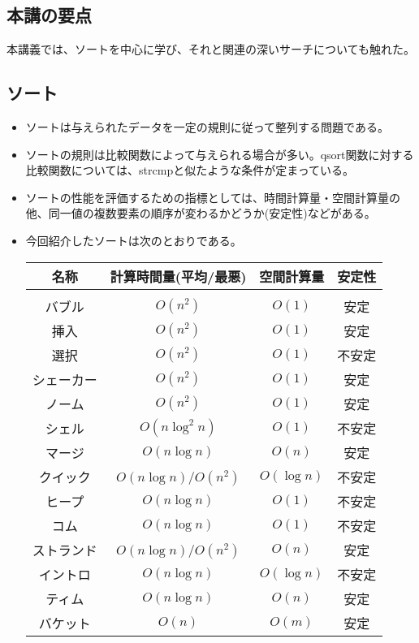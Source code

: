 \begin{shadebox}
\section*{本講の要点}
本講義では、ソートを中心に学び、それと関連の深いサーチについても触れた。
\subsection*{ソート}
\begin{itemize}
\item ソートは与えられたデータを一定の規則に従って整列する問題である。
\item ソートの規則は比較関数によって与えられる場合が多い。qsort関数に対する比較関数については、strcmpと似たような条件が定まっている。
\item ソートの性能を評価するための指標としては、時間計算量・空間計算量の他、同一値の複数要素の順序が変わるかどうか(安定性)などがある。
\item 今回紹介したソートは次のとおりである。
\begin{center}
\begin{tabular}{|c||c|c|c|}\hline 
名称&計算時間量(平均/最悪)&空間計算量&安定性\\ \hline
&&& \\[-15pt] \hline
バブル&$O(n^2)$&$O(1)$&安定\\ \hline
挿入&$O(n^2)$&$O(1)$&安定\\ \hline
選択&$O(n^2)$&$O(1)$&不安定\\ \hline
シェーカー&$O(n^2)$&$O(1)$&安定\\ \hline
ノーム&$O(n^2)$&$O(1)$&安定\\ \hline
シェル&$O(n\log^2 n)$&$O(1)$&不安定\\ \hline
マージ&$O(n\log n)$&$O(n)$&安定\\ \hline
クイック&$O(n\log n)$/$O(n^2)$&$O(\log n)$&不安定\\ \hline
ヒープ&$O(n\log n)$&$O(1)$&不安定\\ \hline
コム&$O(n\log n)$&$O(1)$&不安定\\ \hline
ストランド&$O(n\log n)$/$O(n^2)$&$O(n)$&安定\\ \hline
イントロ&$O(n\log n)$&$O(\log n)$&不安定\\ \hline
ティム&$O(n\log n)$&$O(n)$&安定\\ \hline
バケット&$O(n)$&$O(m)$&安定\\ \hline
\end{tabular}
\end{center}
\end{itemize}


\end{shadebox}
